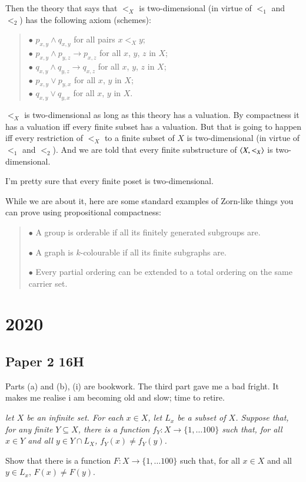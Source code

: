 \documentclass{book}
\begin{document}
Then the theory that says that $<_X$ is two-dimensional (in virtue of
$<_1$ and $<_2$) has the following axiom (schemes):\begin{quote}
$\bullet$ $p_{x,y} \wedge q_{x,y}$ for all pairs $x <_X y$;\\
$\bullet$ $p_{x,y} \wedge p_{y,z} \to p_{x,z}$ for all $x$, $y$, $z$ in $X$;\\
$\bullet$ $q_{x,y} \wedge q_{y,z} \to q_{x,z}$ for all $x$, $y$, $z$ in $X$;\\
$\bullet$ $p_{x,y} \vee p_{y,x}$ for all $x$, $y$ in $X$;\\
$\bullet$ $q_{x,y} \vee q_{y,x}$ for all $x$, $y$ in $X$.
\end{quote}

$<_X$ is two-dimensional as long as this theory has a valuation.  By
compactness it has a valuation iff every finite subset has a
valuation.  But that is going to happen iff every restriction of $<_X$
to a finite subset of $X$ is two-dimensional (in virtue of $<_1$ and
$<_2$).  And we are told that every finite substructure of
$\mbox{$\langle X,<_X \rangle$}$ is two-dimensional.

\smallskip

I'm pretty sure that every finite poset is two-dimensional.

\bigskip

While we are about it, here are some standard examples of Zorn-like
things you can prove using propositional compactness:
\begin{quote}
$\bullet$ A group is orderable if all its finitely generated subgroups are.

$\bullet$ A graph is $k$-colourable if all its finite subgraphs are.

$\bullet$ Every partial ordering can be extended to a total ordering
  on the same carrier set.
\end{quote}

\chapter{2020}

\section*{Paper 2 16H}

Parts (a) and (b), (i) are bookwork.  The third part gave me a bad fright.
It makes me realise i am becoming old and slow; time to retire.

{\sl let $X$ be an infinite set.  For each $x \in X$, let $L_x$ be a
  subset of $X$. Suppose that, for any finite $Y \subseteq X$, there is
  a function $f_Y: X \to \{1,\ldots 100\}$ such that, for all $x \in Y$
  and all $y \in Y \cap L_X$, $f_Y(x) \not= f_Y(y)$.

  Show that there is a function $F:X \to \{1,\ldots 100\}$ such that,
  for all $x \in X$ and all $y \in L_x$, $F(x) \not= F(y)$.}
\end{document}
